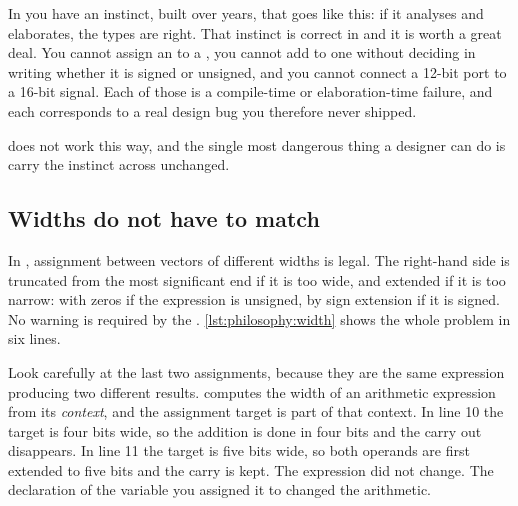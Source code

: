 In \VHDL{} you have an instinct, built over years, that goes like this: if it
analyses and elaborates, the types are right. That instinct is correct in
\VHDL{} and it is worth a great deal. You cannot assign an  to a
, you cannot add  to one without deciding in
writing whether it is signed or unsigned, and you cannot connect a 12-bit port
to a 16-bit signal. Each of those is a compile-time or elaboration-time
failure, and each corresponds to a real design bug you therefore never
shipped.

\SV{} does not work this way, and the single most dangerous thing a \VHDL{}
designer can do is carry the instinct across unchanged.

\subsection{Widths do not have to match}

In \SV{}, assignment between vectors of different widths
is legal. The right-hand side is truncated from the most significant end if it
is too wide, and extended if it is too narrow: with zeros if the expression is
unsigned, by sign extension if it is signed. No warning is required by the
\LRM{}. \cref{lst:philosophy:width} shows the whole problem in six lines.


Look carefully at the last two assignments, because they are the same
expression producing two different results. \SV{} computes the width of an
arithmetic expression from its \emph{context}, and the assignment target is
part of that context. In line 10 the target is four bits wide, so the addition
is done in four bits and the carry out disappears. In line 11 the target is
five bits wide, so both operands are first extended to five bits and the carry
is kept. The expression did not change. The declaration of the variable you
assigned it to changed the arithmetic.

